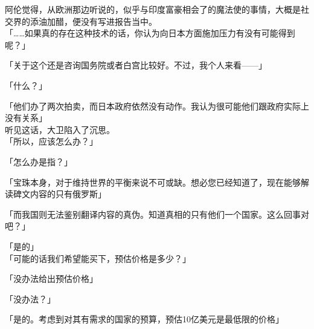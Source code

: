 阿伦觉得，从欧洲那边听说的，似乎与印度富豪相会了的魔法使的事情，大概是社交界的添油加醋，便没有写进报告当中。\\

「……如果真的存在这种技术的话，你认为向日本方面施加压力有没有可能得到呢？」

「关于这个还是咨询国务院或者白宫比较好。不过，我个人来看——」

「什么？」

「他们办了两次拍卖，而日本政府依然没有动作。我认为很可能他们跟政府实际上没有关系」\\

听见这话，大卫陷入了沉思。\\

「所以，应该怎么办？」

「怎么办是指？」

「宝珠本身，对于维持世界的平衡来说不可或缺。想必您已经知道了，现在能够解读碑文内容的只有俄罗斯」

「而我国则无法鉴别翻译内容的真伪。知道真相的只有他们一个国家。这么回事对吧？」

「是的」\\

「可能的话我们希望能买下，预估价格是多少？」

「没办法给出预估价格」

「没办法？」

「是的。考虑到对其有需求的国家的预算，预估10亿美元是最低限的价格」

